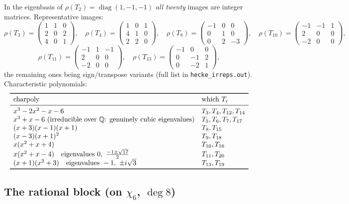 \documentclass[11pt]{article}
\theoremstyle{remark}
\newcommand{\Q}{\mathbb{Q}}
\newcommand{\T}[1]{T_{#1}}
\newcommand{\rh}[1]{\rho(T_{#1})}
\begin{document}
In the eigenbasis of $\rho(\T2)=\operatorname{diag}(1,-1,-1)$ \emph{all
twenty} images are integer matrices. Representative images:
\[
\rh3 = \begin{pmatrix} 1&1&0\\ 2&0&2\\ 4&0&1\end{pmatrix},\quad
\rh4 = \begin{pmatrix} 1&0&1\\ 4&1&0\\ 2&2&0\end{pmatrix},\quad
\rh8 = \begin{pmatrix} -1&0&0\\ 0&1&0\\ 0&2&-3\end{pmatrix},\quad
\rh{10} = \begin{pmatrix} -1&-1&1\\ 2&0&0\\ -2&0&0\end{pmatrix},
\]
\[
\rh{11} = \begin{pmatrix} -1&1&-1\\ 2&0&0\\ -2&0&0\end{pmatrix},\quad
\rh{13} = \begin{pmatrix} -1&0&0\\ 0&-1&2\\ 0&-2&1\end{pmatrix},
\]
the remaining ones being sign/transpose variants (full list in
\texttt{hecke\_irreps.out}). Characteristic polynomials:
\[
\begin{array}{ll}
\toprule
\text{charpoly} & \text{which }\T i\\
\midrule
x^3-2x^2-x-6 & \T3,\T4,\T{12},\T{14}\\
x^3+x-6\ \text{(irreducible over }\Q\text{: genuinely cubic eigenvalues)} & \T5,\T6,\T7,\T{17}\\
(x+3)(x-1)(x+1) & \T8,\T{15}\\
(x-3)(x+1)^2 & \T9,\T{18}\\
x(x^2+x+4) & \T{10},\T{16}\\
x(x^2+x-4)\quad\text{eigenvalues } 0,\ \tfrac{-1\pm\sqrt{17}}{2} & \T{11},\T{20}\\
(x+1)(x^2+3)\quad\text{eigenvalues } -1,\ \pm i\sqrt3 & \T{13},\T{19}\\
\bottomrule
\end{array}
\]

\subsection{The rational block (on $\chi_6$, $\deg 8$)}
\end{document}
